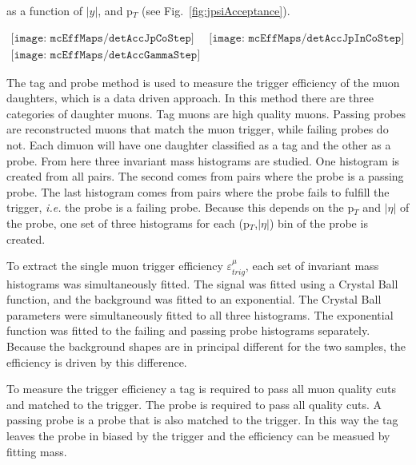        as a function of $|y|$, and p$_{T}$ (see Fig.~\ref{fig:jpsiAcceptance}).
        \begin{figure*}[!Hhtb]
          \centering
          $ \begin{array}{cc}
            \texttt{[image: mcEffMaps/detAccJpCoStep]} &
            \texttt{[image: mcEffMaps/detAccJpInCoStep]} \\
            \texttt{[image: mcEffMaps/detAccGammaStep]}
          \end{array} $
          \caption{Dimuon acceptance from coherent J/$\psi$ (top left), incoherent 
            J$\psi$ (top right), and photon-photon interactions (lower).}
          \label{fig:jpsiAcceptance}
        \end{figure*}

        The tag and probe method is used to measure the trigger efficiency of 
          the muon daughters, which is a data driven approach. 
        In this method there are three categories of daughter muons. 
        Tag muons are high quality muons.
        Passing probes are reconstructed muons that match the muon trigger, 
          while failing probes do not. 
        Each dimuon will have one daughter classified as a tag and the other
          as a probe.
        From here three invariant mass histograms are studied. 
        One histogram is created from all pairs. 
        The second comes from pairs where the probe is a passing probe.  
        The last histogram comes from pairs where the probe fails to fulfill
          the trigger, \textit{i.e.} the probe is a failing probe. 
        Because this depends on the p$_{T}$ and $|\eta|$ of the probe, one set 
          of three histograms for each (p$_{T}$,$|\eta|$) bin of the probe is 
          created.

        To extract the single muon trigger efficiency $\varepsilon^{\mu}_{trig}$, 
          each set of invariant mass histograms was simultaneously fitted. 
        The signal was fitted using a Crystal Ball function, and the background 
          was fitted to an exponential.
        The Crystal Ball parameters were simultaneously fitted to all three 
          histograms.
        The exponential function was fitted to the failing and passing probe 
          histograms separately.
        Because the background shapes are in principal different for the two 
          samples, the efficiency is driven by this difference. 

        To measure the trigger efficiency a tag is required to pass all muon
          quality cuts and matched to the trigger.
        The probe is required to pass all quality cuts. 
        A passing probe is a probe that is also matched to the trigger. 
        In this way the tag leaves the probe in biased by the trigger and the 
          efficiency can be measued by fitting mass.  

